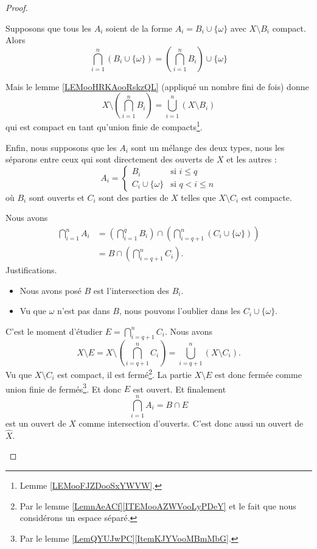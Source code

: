 \begin{proof}
\begin{subproof}
		Supposons que tous les \( A_i\) soient de la forme \( A_i=B_i\cup\{ \omega \}\) avec \( X\setminus B_i\) compact. Alors
		\begin{equation}
			\bigcap_{i=1}^n (B_i\cup\{ \omega \})=\left( \bigcap_{i=1}^nB_i \right)\cup\{ \omega \}
		\end{equation}


		Mais le lemme \ref{LEMooHRKAooRskzQL} (appliqué un nombre fini de fois) donne
		\begin{equation}
			X\setminus\left( \bigcap_{i=1}^nB_i \right)=\bigcup_{i=1}^n(X\setminus B_i)
		\end{equation}
		qui est compact en tant qu'union finie de compacts\footnote{Lemme \ref{LEMooFJZDooSxYWVW}.}.

		Enfin, nous supposons que les \( A_i\) sont un mélange des deux types, nous les séparons entre ceux qui sont directement des ouverts de \( X\) et les autres :
		\begin{equation}
			A_i=\begin{cases}
				B_i                 & \text{si } i\leq q  \\
				C_i\cup\{ \omega \} & \text{si }q<i\leq n
			\end{cases}
		\end{equation}
		où \( B_i\) sont ouverts et \( C_i\) sont des parties de \( X\) telles que \( X\setminus C_i\) est compacte.

		Nous avons
		\begin{subequations}
			\begin{align}
				\bigcap_{i=1}^nA_i & =\left( \bigcap_{i=1}^qB_i \right)\cap\left( \bigcap_{i=q+1}^n(C_i\cup\{ \omega \}) \right) \\
				                   & =B\cap\left( \bigcap_{i=q+1}^nC_i \right).
			\end{align}
		\end{subequations}
		Justifications.
		\begin{itemize}
			\item Nous avons posé \( B\) est l'intersection des \( B_i\).
			\item
			      Vu que \( \omega\) n'est pas dans \( B\), nous pouvons l'oublier dans les \( C_i\cup\{ \omega \}\).
		\end{itemize}
		C'est le moment d'étudier \( E=\bigcap_{i=q+1}^nC_i\). Nous avons
		\begin{equation}
			X\setminus E=X\setminus\left( \bigcap_{i=q+1}^nC_i \right)=\bigcup_{i=q+1}^n(X\setminus C_i).
		\end{equation}
		Vu que \( X\setminus C_i\) est compact, il est fermé\footnote{Par le lemme \ref{LemnAeACf}\ref{ITEMooAZWVooLyPDeY} et le fait que nous considérons un espace séparé.}. La partie \( X\setminus E\) est donc fermée comme union finie de fermés\footnote{Par le lemme \ref{LemQYUJwPC}\ref{ItemKJYVooMBmMbG}.}. Et donc \( E\) est ouvert. Et finalement
		\begin{equation}
			\bigcap_{i=1}^nA_i=B\cap E
		\end{equation}
		est un ouvert de \( X\) comme intersection d'ouverts. C'est donc aussi un ouvert de \( \hat X\).


\end{subproof}
\end{proof}
